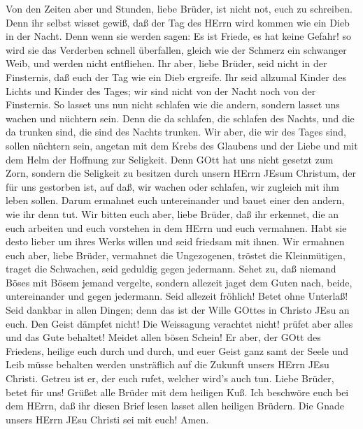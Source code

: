  Von den Zeiten aber und Stunden, liebe Brüder, ist nicht
not, euch zu schreiben.  Denn ihr selbst wisset gewiß, daß
der Tag des HErrn wird kommen wie ein Dieb in der Nacht. 
Denn wenn sie werden sagen: Es ist Friede, es hat keine Gefahr! so wird
sie das Verderben schnell überfallen, gleich wie der Schmerz ein
schwanger Weib, und werden nicht entfliehen.  Ihr aber,
liebe Brüder, seid nicht in der Finsternis, daß euch der Tag wie ein
Dieb ergreife.  Ihr seid allzumal Kinder des Lichts und
Kinder des Tages; wir sind nicht von der Nacht noch von der Finsternis.
 So lasset uns nun nicht schlafen wie die andern, sondern
lasset uns wachen und nüchtern sein.  Denn die da schlafen,
die schlafen des Nachts, und die da trunken sind, die sind des Nachts
trunken.  Wir aber, die wir des Tages sind, sollen nüchtern
sein, angetan mit dem Krebs des Glaubens und der Liebe und mit dem Helm
der Hoffnung zur Seligkeit.  Denn GOtt hat uns nicht gesetzt
zum Zorn, sondern die Seligkeit zu besitzen durch unsern HErrn JEsum
Christum,  der für uns gestorben ist, auf daß, wir wachen
oder schlafen, wir zugleich mit ihm leben sollen.  Darum
ermahnet euch untereinander und bauet einer den andern, wie ihr denn
tut.  Wir bitten euch aber, liebe Brüder, daß ihr erkennet,
die an euch arbeiten und euch vorstehen in dem HErrn und euch vermahnen.
 Habt sie desto lieber um ihres Werks willen und seid
friedsam mit ihnen.  Wir ermahnen euch aber, liebe Brüder,
vermahnet die Ungezogenen, tröstet die Kleinmütigen, traget die
Schwachen, seid geduldig gegen jedermann.  Sehet zu, daß
niemand Böses mit Bösem jemand vergelte, sondern allezeit jaget dem
Guten nach, beide, untereinander und gegen jedermann.  Seid
allezeit fröhlich!  Betet ohne Unterlaß!  Seid
dankbar in allen Dingen; denn das ist der Wille GOttes in Christo JEsu
an euch.  Den Geist dämpfet nicht!  Die
Weissagung verachtet nicht!  prüfet aber alles und das Gute
behaltet!  Meidet allen bösen Schein!  Er
aber, der GOtt des Friedens, heilige euch durch und durch, und euer
Geist ganz samt der Seele und Leib müsse behalten werden unsträflich auf
die Zukunft unsers HErrn JEsu Christi.  Getreu ist er, der
euch rufet, welcher wird's auch tun.  Liebe Brüder, betet
für uns!  Grüßet alle Brüder mit dem heiligen Kuß.
 Ich beschwöre euch bei dem HErrn, daß ihr diesen Brief
lesen lasset allen heiligen Brüdern.  Die Gnade unsers
HErrn JEsu Christi sei mit euch! Amen.
